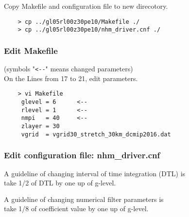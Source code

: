 \documentclass[a4paper]{article}
\begin{document}
 \noindent Copy Makefile and configuration file to new direcotory.
 \begin{verbatim}
    > cp ../gl05rl00z30pe10/Makefile ./
    > cp ../gl05rl00z30pe10/nhm_driver.cnf ./
 \end{verbatim}

\subsubsection{Edit Makefile}
 (symbols "\verb|<--|" means changed parameters) \\
 On the Lines from 17 to 21, edit parameters.
 \begin{verbatim}
    > vi Makefile
     glevel = 6      <--
     rlevel = 1      <--
     nmpi   = 40     <--
     zlayer = 30
     vgrid  = vgrid30_stretch_30km_dcmip2016.dat
 \end{verbatim}

\subsubsection{Edit configuration file: nhm\_driver.cnf}
 \noindent A guideline of changing interval of time integration (DTL) is \\
 {\sf take 1/2 of DTL by one up of g-level}.

 \noindent A guideline of changing numerical filter parameters is \\
 {\sf take 1/8 of coefficient value by one up of g-level}. \\
\end{document}
